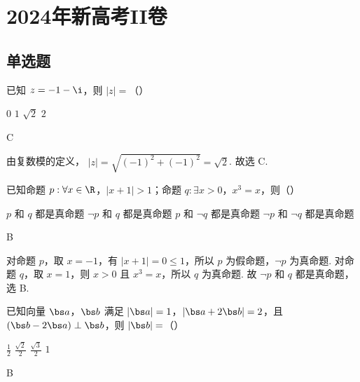 \chapter{2024年新高考II卷}

\section{单选题}

\begin{problem}
已知 \(z=-1-\i\)，则 \(|z|=\)（\quad）

\choices
    {\(0\)}
    {\(1\)}
    {\(\sqrt2\)}
    {\(2\)}
\end{problem}

\begin{answer}
C
\end{answer}

\begin{solution}
由复数模的定义，
\(|z|=\sqrt{(-1)^2+(-1)^2}=\sqrt2\).
故选 C.
\end{solution}

\begin{problem}
已知命题 \(p:\forall x\in\R\)，\(|x+1|>1\)；命题 \(q:\exists x>0\)，\(x^3=x\)，则（\quad）

\choices
    {\(p\) 和 \(q\) 都是真命题}
    {\(\neg p\) 和 \(q\) 都是真命题}
    {\(p\) 和 \(\neg q\) 都是真命题}
    {\(\neg p\) 和 \(\neg q\) 都是真命题}
\end{problem}

\begin{answer}
B
\end{answer}

\begin{solution}
对命题 \(p\)，取 \(x=-1\)，有 \(|x+1|=0\le 1\)，所以 \(p\) 为假命题，\(\neg p\) 为真命题.
对命题 \(q\)，取 \(x=1\)，则 \(x>0\) 且 \(x^3=x\)，所以 \(q\) 为真命题.
故 \(\neg p\) 和 \(q\) 都是真命题，选 B.
\end{solution}

\begin{problem}
已知向量 \(\bs a\)，\(\bs b\) 满足 \(|\bs a|=1\)，\(|\bs a+2\bs b|=2\)，且 \((\bs b-2\bs a)\perp \bs b\)，则 \(|\bs b|=\)（\quad）

\choices
    {\(\frac12\)}
    {\(\frac{\sqrt2}{2}\)}
    {\(\frac{\sqrt3}{2}\)}
    {\(1\)}
\end{problem}

\begin{answer}
B
\end{answer}

